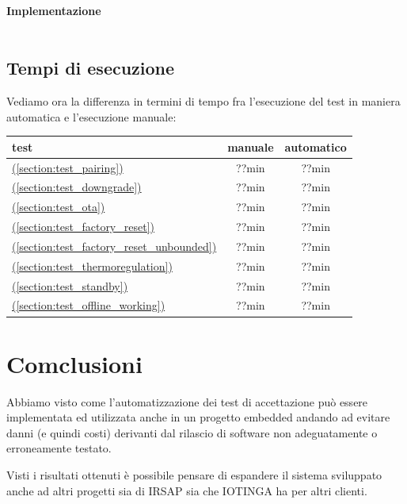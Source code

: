 \documentclass[12pt,a4paper,twoside,titlepage]{book}
\newcommand*{\fullref}[1]{\hyperref[{#1}]{\nameref*{#1} (\ref*{#1})}}
\begin{document}
\subsubsection{Implementazione}
\inputminted{python3}{src/offline_working.py}

\section{Tempi di esecuzione}

Vediamo ora la differenza in termini di tempo fra l'esecuzione del test in maniera automatica
e l'esecuzione manuale:

\begin{center}
\begin{tabular}{| l | c | c |}
    \hline
    \textbf{test} & \textbf{manuale} & \textbf{automatico} \\ \hline
    \fullref{section:test_pairing} & ??min & ??min \\ \hline
    \fullref{section:test_downgrade} & ??min & ??min \\ \hline
    \fullref{section:test_ota} & ??min & ??min \\ \hline
    \fullref{section:test_factory_reset} & ??min & ??min \\ \hline
    \fullref{section:test_factory_reset_unbounded} & ??min & ??min \\ \hline 
    \fullref{section:test_thermoregulation} & ??min & ??min \\ \hline 
    \fullref{section:test_standby} & ??min & ??min \\ \hline 
    \fullref{section:test_offline_working} & ??min & ??min \\ \hline 
\end{tabular}
\end{center}

\chapter{Comclusioni}

Abbiamo visto come l'automatizzazione dei test di accettazione può essere implementata
ed utilizzata anche in un progetto embedded andando ad evitare danni (e quindi costi)
derivanti dal rilascio di software non adeguatamente o erroneamente testato.

Visti i risultati ottenuti è possibile pensare di espandere il sistema sviluppato
anche ad altri progetti sia di IRSAP sia che IOTINGA ha per altri clienti.
\end{document}
